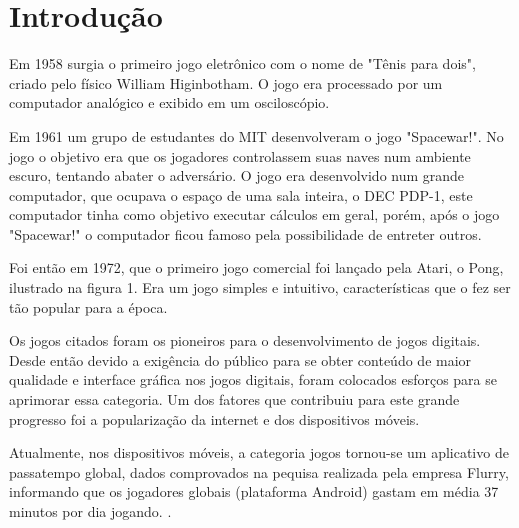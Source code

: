 \chapter{Introdução}
\label{cap:introducao}
 
 
Em 1958 surgia o primeiro jogo eletrônico com o nome de "Tênis para dois", criado pelo físico William Higinbotham. O jogo era processado por um computador analógico e exibido em um osciloscópio.
\cite{mass}


Em 1961 um grupo de estudantes do MIT desenvolveram o jogo "Spacewar!". No jogo o objetivo era que os jogadores controlassem suas naves num ambiente escuro, tentando abater o adversário. O jogo era desenvolvido num grande computador, que ocupava o espaço de uma sala inteira, o DEC PDP-1, este computador tinha como objetivo executar cálculos em geral, porém, após o jogo "Spacewar!" o computador ficou famoso pela possibilidade de entreter outros. \cite{ram}


Foi então em 1972, que o primeiro jogo comercial foi lançado pela Atari, o Pong, ilustrado na figura 1. Era um jogo simples e intuitivo, características que o fez ser tão popular para a época. \cite{tracc} 

\begin{figure}[h!]
		\centering
	\end{figure}

Os jogos citados foram os pioneiros para o desenvolvimento de jogos digitais. Desde então devido a exigência do público para se obter conteúdo de maior qualidade e interface gráfica nos jogos digitais, foram colocados esforços para se aprimorar essa categoria. Um dos fatores que contribuiu para este grande progresso foi a popularização da internet e dos dispositivos móveis.

Atualmente, nos dispositivos móveis, a categoria jogos tornou-se um aplicativo de passatempo global, dados comprovados na pequisa realizada pela empresa Flurry, informando que os jogadores globais (plataforma Android) gastam em média 37 minutos por dia jogando. \cite{flur}. 

